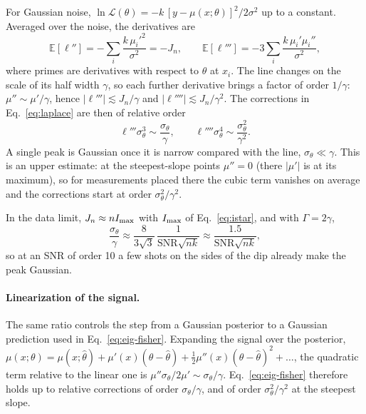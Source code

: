 For Gaussian noise, $\ln\mathcal L(\theta)=-k\,[y-\mu(x;\theta)]^2/2\sigma^2$ up to a constant. Averaged over the
noise, the derivatives are
\begin{equation*}
  \mathbb E[\ell'']=-\sum_i\frac{k\,\mu_i'^2}{\sigma^2}=-J_n,\qquad
  \mathbb E[\ell''']=-3\sum_i\frac{k\,\mu_i'\mu_i''}{\sigma^2},
\end{equation*}
where primes are derivatives with respect to $\theta$ at $x_i$. The line changes on the scale
of its half width $\gamma$, so each further derivative brings a factor of order $1/\gamma$: $\mu''\sim\mu'/\gamma$,
hence $|\ell'''|\lesssim J_n/\gamma$ and $|\ell''''|\lesssim J_n/\gamma^2$. The corrections in Eq.~\eqref{eq:laplace} are
then of relative order
\begin{equation}
  \ell'''\sigma_\theta^3\sim\frac{\sigma_\theta}{\gamma},\qquad \ell''''\sigma_\theta^4\sim\frac{\sigma_\theta^2}{\gamma^2}.
  \label{eq:gauss-corrections}
\end{equation}
A single peak is Gaussian once it is narrow compared with the line, $\sigma_\theta\ll\gamma$. This is an upper
estimate: at the steepest-slope points $\mu''=0$ (there $|\mu'|$ is at its maximum), so for measurements placed there
the cubic term vanishes on average and the corrections start at order $\sigma_\theta^2/\gamma^2$.

In the data limit, $J_n\approx nI_{\rm max}$ with $I_{\rm max}$ of Eq.~\eqref{eq:istar}, and with $\Gamma=2\gamma$,
\begin{equation*}
  \frac{\sigma_\theta}{\gamma}\approx\frac{8}{3\sqrt3}\,\frac{1}{\mathrm{SNR}\sqrt{nk}}
  \approx\frac{1.5}{\mathrm{SNR}\sqrt{nk}} ,
\end{equation*}
so at an SNR of order 10 a few shots on the sides of the dip already make the peak Gaussian.

\paragraph{Linearization of the signal.} The same ratio controls the step from a Gaussian posterior to a Gaussian
prediction used in Eq.~\eqref{eq:eig-fisher}. Expanding the signal over the posterior,
$\mu(x;\theta)=\mu(x;\hat\theta)+\mu'(x)(\theta-\hat\theta)+\tfrac12\mu''(x)(\theta-\hat\theta)^2+\dots$, the
quadratic term relative to the linear one is $\mu''\sigma_\theta/2\mu'\sim\sigma_\theta/\gamma$. Eq.~\eqref{eq:eig-fisher}
therefore holds up to relative corrections of order $\sigma_\theta/\gamma$, and of order $\sigma_\theta^2/\gamma^2$
at the steepest slope.

